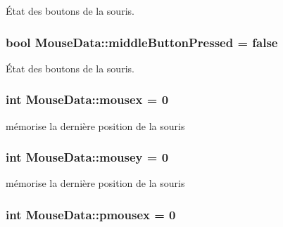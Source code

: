 État des boutons de la souris. 

\subsubsection[{\texorpdfstring{middle\+Button\+Pressed}{middleButtonPressed}}]{\setlength{\rightskip}{0pt plus 5cm}bool Mouse\+Data\+::middle\+Button\+Pressed = false\hspace{0.3cm}{\ttfamily [static]}}\hypertarget{class_mouse_data_a00962824d35b75221cc3198467cc8907}{}\label{class_mouse_data_a00962824d35b75221cc3198467cc8907}


État des boutons de la souris. 

\subsubsection[{\texorpdfstring{mousex}{mousex}}]{\setlength{\rightskip}{0pt plus 5cm}int Mouse\+Data\+::mousex = 0\hspace{0.3cm}{\ttfamily [static]}}\hypertarget{class_mouse_data_a97eb3138f2f52f859b0d16e683d8cfcb}{}\label{class_mouse_data_a97eb3138f2f52f859b0d16e683d8cfcb}


mémorise la dernière position de la souris 

\subsubsection[{\texorpdfstring{mousey}{mousey}}]{\setlength{\rightskip}{0pt plus 5cm}int Mouse\+Data\+::mousey = 0\hspace{0.3cm}{\ttfamily [static]}}\hypertarget{class_mouse_data_aea43f059e0ff26829a0a8d8619b3f18c}{}\label{class_mouse_data_aea43f059e0ff26829a0a8d8619b3f18c}


mémorise la dernière position de la souris 

\subsubsection[{\texorpdfstring{pmousex}{pmousex}}]{\setlength{\rightskip}{0pt plus 5cm}int Mouse\+Data\+::pmousex = 0\hspace{0.3cm}{\ttfamily [static]}}\hypertarget{class_mouse_data_a7694431e993365b4817ff2e9ac161555}{}\label{class_mouse_data_a7694431e993365b4817ff2e9ac161555}


